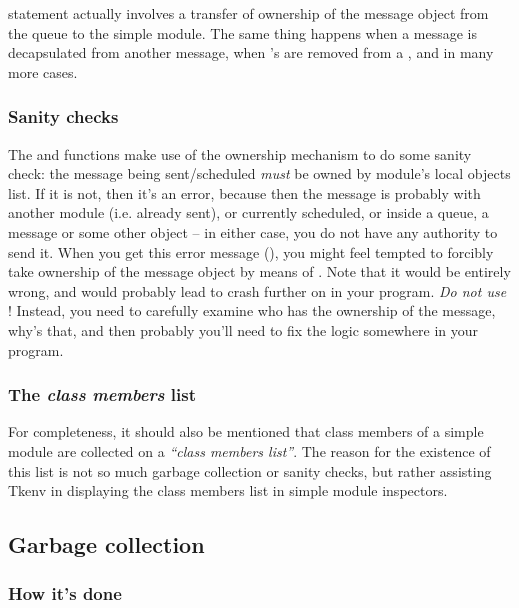 statement actually involves a transfer of ownership of the message
object from the queue to the simple module.
The same thing happens when a message is decapsulated from another message,
when 's are removed from a , and in many more cases.


\subsubsection{Sanity checks}

The  and  functions make use
of the ownership mechanism to do some sanity check:
the message being sent/scheduled \textit{must} be owned
by module's local objects list.
If it is not, then it's an error, because then the message is
probably with another module (i.e. already sent), or
currently scheduled, or inside a queue, a message or some
other object -- in either case, you do not have any authority
to send it. When you get this error message (),
you might feel tempted to forcibly take ownership of the message object
by means of . Note that it would be
entirely wrong, and would probably lead to crash further on in
your program. \textit{Do not use} ! Instead,
you need to carefully examine who
has the ownership of the message, why's that, and then
probably you'll need to fix the logic somewhere
in your program.

\subsubsection{The \textit{class members} list}

For completeness, it should also be mentioned that class
members of a simple module are collected on a \textit{``class members list''}.
The reason for the existence of this list is not so much garbage collection
or sanity checks, but rather assisting Tkenv in displaying
the class members list in simple module inspectors.




\subsection{Garbage collection}
\label{sec:ch-sim-lib:garbage-collection}

\subsubsection{How it's done}

